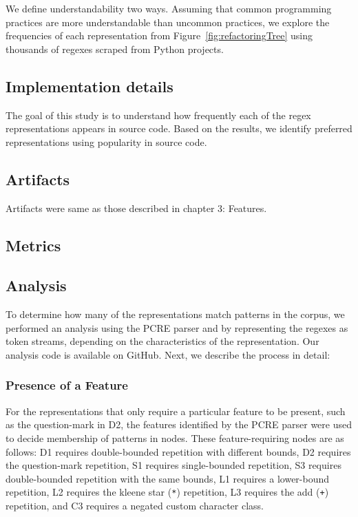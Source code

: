 We define understandability two ways. Assuming that common programming practices are more understandable than uncommon practices, we explore the frequencies of each representation from Figure~\ref{fig:refactoringTree} using thousands of regexes scraped from Python projects.
\subsection{Implementation details}
The goal of this study is to understand how frequently each of the regex representations appears in source code. Based on the results, we identify preferred representations using popularity in source code.

\subsection{Artifacts}
Artifacts were same as those described in chapter 3: Features.

\subsection{Metrics}

\subsection{Analysis}
To determine how many of the representations match patterns in the corpus, we performed an analysis using the PCRE parser and by representing the regexes as token streams, depending on the characteristics of the representation. Our analysis code is available on GitHub. Next, we describe the process in detail:

\subsubsection{Presence of a Feature}
For the representations that only require a particular feature to be present, such as the question-mark in D2, the features identified by the PCRE parser were used to decide membership of patterns in nodes.
These feature-requiring nodes are as follows: D1 requires double-bounded repetition with different bounds, D2 requires the question-mark repetition, S1 requires single-bounded repetition, S3 requires double-bounded repetition with the same bounds,  L1 requires a lower-bound repetition, L2 requires the kleene star (\verb!*!) repetition, L3 requires the add (\verb!+!) repetition, and C3 requires a negated custom character class.

